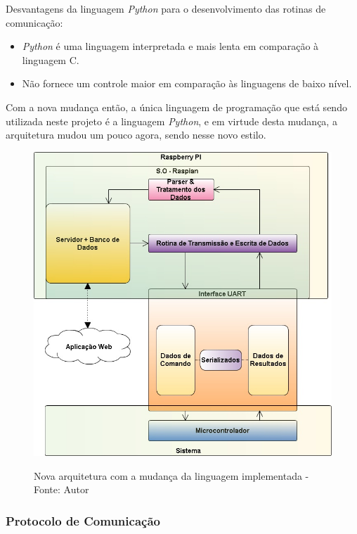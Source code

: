Desvantagens da linguagem \textit{Python} para o desenvolvimento das rotinas de comunicação:

\begin{itemize}
    \item \textit{Python} é uma linguagem interpretada e mais lenta em comparação à linguagem C.
    \item Não fornece um controle maior em comparação às linguagens de baixo nível.
\end{itemize}

Com a nova mudança então, a única linguagem de programação que está sendo utilizada neste projeto é a linguagem \textit{Python}, e em virtude 
desta mudança, a arquitetura mudou um pouco agora, sendo nesse novo estilo.

\begin{figure}[H]
\centering
\includegraphics[keepaspectratio=true,scale=0.7]{figuras/nova_arquitetura.png}
\label{fig:nova_arquitetura}
\caption{Nova arquitetura com a mudança da linguagem implementada - Fonte: Autor}
\end{figure}

\subsubsection*{\textbf{Protocolo de Comunicação}} \label{software:protocolo}

